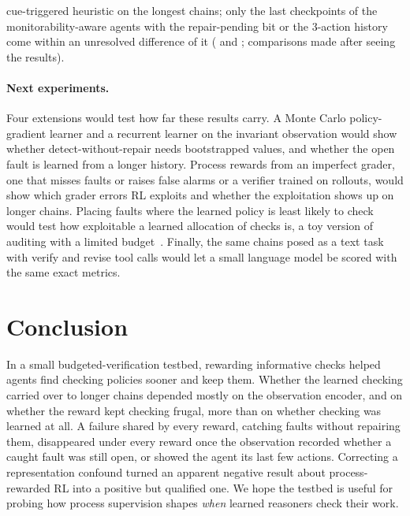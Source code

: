 cue-triggered heuristic on the longest chains; only the last checkpoints of the monitorability-aware agents with the repair-pending bit or the 3-action history come within an unresolved difference of it ( and ; comparisons made after seeing the results).

\paragraph{Next experiments.}
Four extensions would test how far these results carry. A Monte Carlo policy-gradient learner and a recurrent learner on the invariant observation would show whether detect-without-repair needs bootstrapped values, and whether the open fault is learned from a longer history. Process rewards from an imperfect grader, one that misses faults or raises false alarms or a verifier trained on rollouts, would show which grader errors RL exploits and whether the exploitation shows up on longer chains. Placing faults where the learned policy is least likely to check would test how exploitable a learned allocation of checks is, a toy version of auditing with a limited budget~\citep{greenblatt2024control}. Finally, the same chains posed as a text task with verify and revise tool calls would let a small language model be scored with the same exact metrics.

\section{Conclusion}
In a small budgeted-verification testbed, rewarding informative checks helped agents find checking policies sooner and keep them. Whether the learned checking carried over to longer chains depended mostly on the observation encoder, and on whether the reward kept checking frugal, more than on whether checking was learned at all. A failure shared by every reward, catching faults without repairing them, disappeared under every reward once the observation recorded whether a caught fault was still open, or showed the agent its last few actions. Correcting a representation confound turned an apparent negative result about process-rewarded RL into a positive but qualified one. We hope the testbed is useful for probing how process supervision shapes \emph{when} learned reasoners check their work.

